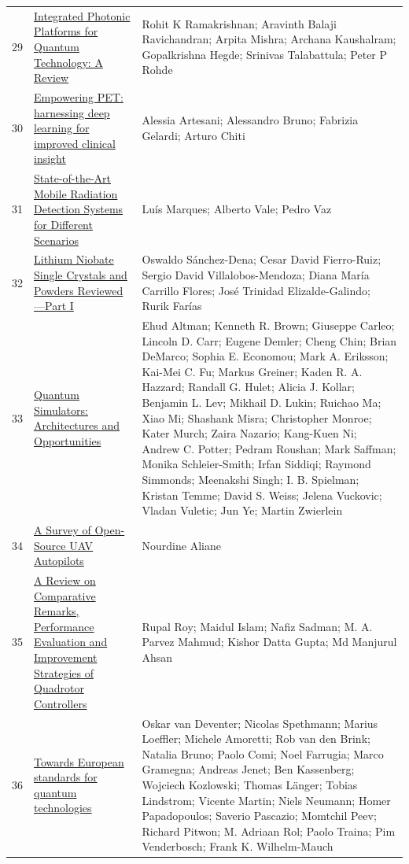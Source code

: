 \documentclass[11pt]{article}
\begin{document}
\begin{longtable}{cp{8cm}p{5cm}}
  29 & \href{https://arxiv.org/abs/2206.15383}{Integrated Photonic Platforms for Quantum Technology: A Review} & Rohit K Ramakrishnan; Aravinth Balaji Ravichandran; Arpita Mishra; Archana Kaushalram; Gopalkrishna Hegde; Srinivas Talabattula; Peter P Rohde \\
  30 & \href{https://eurradiolexp.springeropen.com/articles/10.1186/s41747-023-00413-1}{Empowering PET: harnessing deep learning for improved clinical insight} & Alessia Artesani; Alessandro Bruno; Fabrizia Gelardi; Arturo Chiti \\
  31 & \href{https://www.mdpi.com/1424-8220/21/4/1051}{State-of-the-Art Mobile Radiation Detection Systems for Different Scenarios} & Luís Marques; Alberto Vale; Pedro Vaz \\
  32 & \href{https://www.mdpi.com/2073-4352/10/11/973}{Lithium Niobate Single Crystals and Powders Reviewed—Part I} & Oswaldo Sánchez-Dena; Cesar David Fierro-Ruiz; Sergio David Villalobos-Mendoza; Diana María Carrillo Flores; José Trinidad Elizalde-Galindo; Rurik Farías \\
  33 & \href{https://arxiv.org/abs/1912.06938}{Quantum Simulators: Architectures and Opportunities} & Ehud Altman; Kenneth R. Brown; Giuseppe Carleo; Lincoln D. Carr; Eugene Demler; Cheng Chin; Brian DeMarco; Sophia E. Economou; Mark A. Eriksson; Kai-Mei C. Fu; Markus Greiner; Kaden R. A. Hazzard; Randall G. Hulet; Alicia J. Kollar; Benjamin L. Lev; Mikhail D. Lukin; Ruichao Ma; Xiao Mi; Shashank Misra; Christopher Monroe; Kater Murch; Zaira Nazario; Kang-Kuen Ni; Andrew C. Potter; Pedram Roushan; Mark Saffman; Monika Schleier-Smith; Irfan Siddiqi; Raymond Simmonds; Meenakshi Singh; I. B. Spielman; Kristan Temme; David S. Weiss; Jelena Vuckovic; Vladan Vuletic; Jun Ye; Martin Zwierlein \\
  34 & \href{https://www.mdpi.com/2079-9292/13/23/4785}{A Survey of Open-Source UAV Autopilots} & Nourdine Aliane \\
  35 & \href{https://www.mdpi.com/2227-7080/9/2/37}{A Review on Comparative Remarks, Performance Evaluation and Improvement Strategies of Quadrotor Controllers} & Rupal Roy; Maidul Islam; Nafiz Sadman; M. A. Parvez Mahmud; Kishor Datta Gupta; Md Manjurul Ahsan \\
  36 & \href{https://epjquantumtechnology.springeropen.com/articles/10.1140/epjqt/s40507-022-00150-1}{Towards European standards for quantum technologies} & Oskar van Deventer; Nicolas Spethmann; Marius Loeffler; Michele Amoretti; Rob van den Brink; Natalia Bruno; Paolo Comi; Noel Farrugia; Marco Gramegna; Andreas Jenet; Ben Kassenberg; Wojciech Kozlowski; Thomas Länger; Tobias Lindstrom; Vicente Martin; Niels Neumann; Homer Papadopoulos; Saverio Pascazio; Momtchil Peev; Richard Pitwon; M. Adriaan Rol; Paolo Traina; Pim Venderbosch; Frank K. Wilhelm-Mauch \\

\end{longtable}
\end{document}

